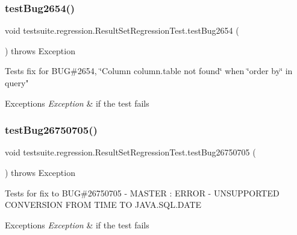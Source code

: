 \subsubsection{\texorpdfstring{test\+Bug2654()}{testBug2654()}}
{\footnotesize\ttfamily void testsuite.\+regression.\+Result\+Set\+Regression\+Test.\+test\+Bug2654 (\begin{DoxyParamCaption}{ }\end{DoxyParamCaption}) throws Exception}

Tests fix for B\+UG\#2654, \char`\"{}\+Column \textquotesingle{}column.\+table\textquotesingle{} not found\char`\"{} when \char`\"{}order by\char`\"{} in query"


\begin{DoxyExceptions}{Exceptions}
{\em Exception} & if the test fails \\
\hline
\end{DoxyExceptions}
\mbox{\label{classtestsuite_1_1regression_1_1_result_set_regression_test_ab55112fe15585a967fd38cf93a88972b}} 
\subsubsection{\texorpdfstring{test\+Bug26750705()}{testBug26750705()}}
{\footnotesize\ttfamily void testsuite.\+regression.\+Result\+Set\+Regression\+Test.\+test\+Bug26750705 (\begin{DoxyParamCaption}{ }\end{DoxyParamCaption}) throws Exception}

Tests for fix to B\+UG\#26750705 -\/ M\+A\+S\+T\+ER \+: E\+R\+R\+OR -\/ U\+N\+S\+U\+P\+P\+O\+R\+T\+ED C\+O\+N\+V\+E\+R\+S\+I\+ON F\+R\+OM T\+I\+ME TO J\+A\+V\+A.\+S\+Q\+L.\+D\+A\+TE


\begin{DoxyExceptions}{Exceptions}
{\em Exception} & if the test fails \\
\hline
\end{DoxyExceptions}
\mbox{\label{classtestsuite_1_1regression_1_1_result_set_regression_test_a025d8f10b5713673139e324fd77a7482}} 
